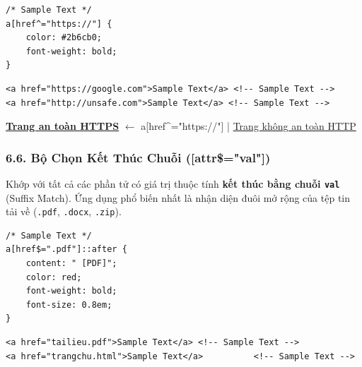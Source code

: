 \documentclass[11pt,oneside]{book}
\newcommand{\codeinline}[1]{\textcolor{accentOrange}{\texttt{#1}}}
\begin{document}
\begin{codeWindow}
\begin{lstlisting}[language=CSS3]
/* Sample Text */
a[href^="https://"] {
    color: #2b6cb0;
    font-weight: bold;
}
\end{lstlisting}

\begin{lstlisting}[language=HTML5]
<a href="https://google.com">Sample Text</a> <!-- Sample Text -->
<a href="http://unsafe.com">Sample Text</a> <!-- Sample Text -->
\end{lstlisting}
\end{codeWindow}

\begin{browserWindow}
\sffamily\small
\textcolor{primaryBlue}{\textbf{\underline{Trang an toàn HTTPS}}} \textcolor{gray!60}{\scriptsize $\leftarrow$ a[href\textasciicircum{}="https://"]} \quad | \quad
\textcolor{darkText}{\underline{Trang không an toàn HTTP}}
\end{browserWindow}

\subsubsection{6.6. Bộ Chọn Kết Thúc Chuỗi ([attr\$="val"])}

\begin{conceptBox}
Khớp với tất cả các phần tử có giá trị thuộc tính \textbf{kết thúc bằng chuỗi \codeinline{val}} (Suffix Match). Ứng dụng phổ biến nhất là nhận diện đuôi mở rộng của tệp tin tải về (\codeinline{.pdf}, \codeinline{.docx}, \codeinline{.zip}).
\end{conceptBox}

\begin{codeWindow}
\begin{lstlisting}[language=CSS3]
/* Sample Text */
a[href$=".pdf"]::after {
    content: " [PDF]";
    color: red;
    font-weight: bold;
    font-size: 0.8em;
}
\end{lstlisting}

\begin{lstlisting}[language=HTML5]
<a href="tailieu.pdf">Sample Text</a> <!-- Sample Text -->
<a href="trangchu.html">Sample Text</a>          <!-- Sample Text -->
\end{lstlisting}
\end{codeWindow}
\end{document}
